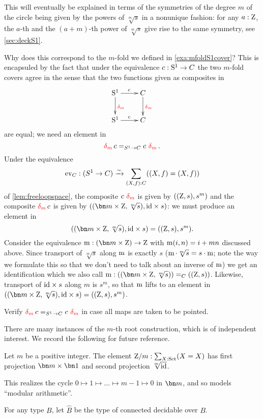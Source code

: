 \begin{example}
This will eventually be explained in terms of the symmetries of the 
degree $m$ \covering of the circle being given by the powers of $\sqrt[m]s$ in a 
nonunique fashion: for any $a:\mathrm{Z}$, the $a$-th and the $(a+m)$-th power of 
$\sqrt[m]s$ give rise to the same symmetry, see \cref{sec:deckS1}.

Why does this correspond to the $m$-fold \covering we defined in \cref{exa:mfoldS1cover}?  
This is encapsuled by the fact that under the equivalence $c:{\mathrm{S}^1}\to C$ the two $m$-fold covers agree in the sense that the two functions given as composites in
$$\xymatrix{\Sc\ar[r]^c\ar[d]^{\dg{m}}&C\ar[d]^{\dg{m}}\\\Sc\ar[r]^c&C}$$ 
are equal; we need an element in
$$\dg{m}c=_{S^1\to C}c\,\dg{m}.$$
Under the equivalence 
$$\mathrm{ev}_C:(S^1\to C)\xrightarrow{\sim} \sum_{(X,f):C}((X,f)=(X,f))$$ of \cref{lem:freeloopspace}, 
the composite $c\,\dg{m}$ is given by $((\mathrm{Z},s),s^m)$
and the composite $\dg{m}c$ is given by
$((\bn m\times\zet,\sqrt[m]s),\id\times s)$: we must produce an element in 
$$((\bn m\times\zet,\sqrt[m]s),\id\times s)=((\zet,s),s^m).$$
Consider the equivalence  $\mZ: (\bn m\times \zet)\to\zet$ with $\mZ(i,n)=i+mn$ discussed above.  Since transport of $\sqrt[m]s$ along $\mZ$ is exactly $s$ (\ie $\mZ\cdot\sqrt[m]s=s\cdot\mZ$; 
note the way we formulate this so that we don't need to talk about an inverse of $\mZ$) we get an identification which we also call $\mZ:((\bn m\times\zet,\sqrt[m]s))=_C((\zet,s))$.  Likewise, transport of $\mathord{\mathrm{id}}\times s$ along $m$ is $s^m$, so that $\mZ$ lifts to an element in
$((\bn m\times\zet,\sqrt[m]s),\id\times s)=((\zet,s),s^m)$.
\end{example}

\begin{xca}\label{xca:pointed-maps-circle}
Verify $\dg{m}c=_{S^1\to C}c\,\dg{m}$ in case all maps are taken to be pointed. 
\end{xca}

There are many instances of the $m$-th root construction, which is of independent interest.  
We record the following for future reference.
\begin{definition} \label{def:Zetmodm}
Let $m$ be a positive integer.
The element $\mathrm{Z}/m:\sum_{X:\mathrm{Set}}(X=X)$ has first projection $\bn m\times\bn 1$ and 
second projection $\sqrt[m]{\mathord{\mathrm{id}}}$.
\end{definition}
\noindent
This realizes the cycle $0\mapsto1\mapsto\dots\mapsto m-1\mapsto 0$ in $\bn m$, 
and so models ``modular arithmetic''.

\begin{definition} \label{def:hatCovering}
For any type $B$, let $\hat B$ be the type of connected decidable \coverings over $B$.
\end{definition}

